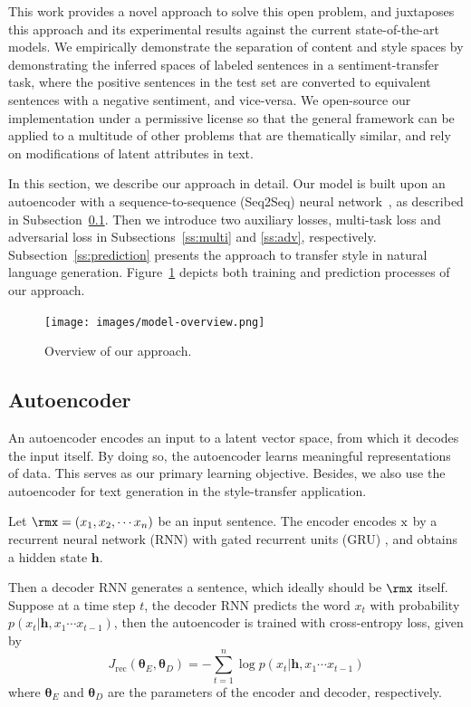 This work provides a novel approach to solve this open problem, and juxtaposes this approach and its experimental results against the current state-of-the-art models. We empirically demonstrate the separation of content and style spaces by demonstrating the inferred spaces of labeled sentences in a sentiment-transfer task, where the positive sentences in the test set are converted to equivalent sentences with a negative sentiment, and vice-versa. We open-source our implementation under a permissive license so that the general framework can be applied to a multitude of other problems that are thematically similar, and rely on modifications of latent attributes in text.

In this section, we describe our approach in detail. Our model is built upon an autoencoder with a sequence-to-sequence (Seq2Seq) neural network~\cite{sutskever2014sequence}, as described in Subsection~\ref{ss:seq2seq}. Then we introduce two auxiliary losses, multi-task loss and adversarial loss in Subsections~\ref{ss:multi} and \ref{ss:adv}, respectively. Subsection~\ref{ss:prediction} presents the approach to transfer style in natural language generation. Figure~\ref{fig:model-overview} depicts both training and prediction processes of our approach.

\begin{figure}[ht]
	\centering
	\texttt{[image: images/model-overview.png]}
	\caption{Overview of our approach.}
	\label{fig:model-overview}
\end{figure}

\subsection{Autoencoder}\label{ss:seq2seq}

An autoencoder encodes an input to a latent vector space, from which it decodes the input itself. By doing so, the autoencoder learns meaningful representations of data. This serves as our primary learning objective. Besides, we also use the autoencoder for text generation in the style-transfer application.

Let $\rmx=(x_1, x_2, \cdots x_n)$ be an input sentence. The encoder encodes $\rm x$ by a recurrent neural network (RNN) with gated recurrent units (GRU) \cite{cho2014learning}, and obtains a hidden state $\bm h$.

Then a decoder RNN generates a sentence, which ideally should be $\rmx$ itself. Suppose at a time step $t$, the decoder RNN predicts the word $x_t$ with probability $p(x_t|\bm h, x_1\cdots x_{t-1})$, then the autoencoder is trained with cross-entropy loss, given by
\begin{equation}\nonumber
	J_\text{rec}(\bm\theta_E,\bm\theta_D)= -\sum_{t=1}^n \log
	p(x_t|\bm h, x_1\cdots x_{t-1})
\end{equation}
where $\bm\theta_E$ and $\bm\theta_D$ are the parameters of the encoder and decoder, respectively.

